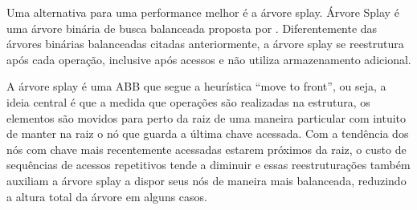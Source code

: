 Uma alternativa para uma performance melhor é a árvore splay. Árvore Splay é uma árvore binária de busca balanceada proposta por \cite{selfadjustingbst}. Diferentemente das árvores binárias balanceadas citadas anteriormente, a árvore splay se reestrutura após cada operação, inclusive após acessos e não utiliza armazenamento adicional.

A árvore splay é uma ABB que segue a heurística “move to front”, ou seja, a ideia central é que a medida que operações são realizadas na estrutura, os elementos são movidos para perto da raiz de uma maneira particular com intuito de manter na raiz o nó que guarda a última chave acessada.
Com a tendência dos nós com chave mais recentemente acessadas estarem próximos da raiz, o custo de sequências de acessos repetitivos tende a diminuir e essas reestruturações também auxiliam a árvore splay a dispor seus nós de maneira mais balanceada, reduzindo a altura total da árvore em alguns casos.

